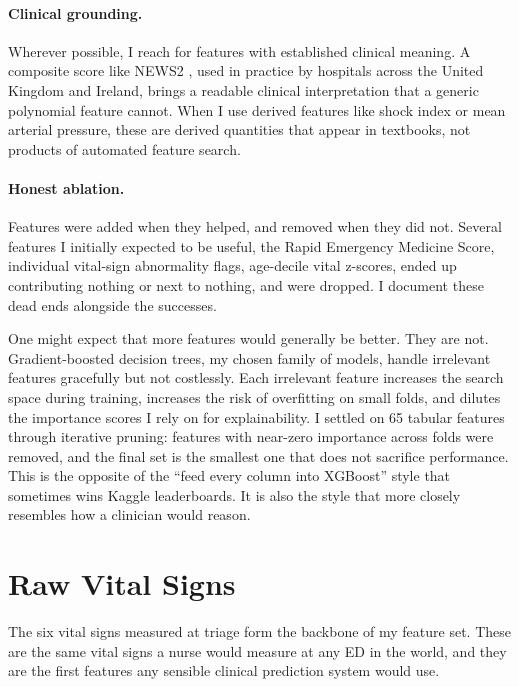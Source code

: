 \paragraph{Clinical grounding.} Wherever possible, I reach for features with established clinical meaning. A composite score like NEWS2 \citep{rcp2017news2}, used in practice by hospitals across the United Kingdom and Ireland, brings a readable clinical interpretation that a generic polynomial feature cannot. When I use derived features like shock index or mean arterial pressure, these are derived quantities that appear in textbooks, not products of automated feature search.

\paragraph{Honest ablation.} Features were added when they helped, and removed when they did not. Several features I initially expected to be useful, the Rapid Emergency Medicine Score, individual vital-sign abnormality flags, age-decile vital z-scores, ended up contributing nothing or next to nothing, and were dropped. I document these dead ends alongside the successes.

\begin{remarkbox}
One might expect that more features would generally be better. They are not. Gradient-boosted decision trees, my chosen family of models, handle irrelevant features gracefully but not costlessly. Each irrelevant feature increases the search space during training, increases the risk of overfitting on small folds, and dilutes the importance scores I rely on for explainability. I settled on 65 tabular features through iterative pruning: features with near-zero importance across folds were removed, and the final set is the smallest one that does not sacrifice performance. This is the opposite of the ``feed every column into XGBoost'' style that sometimes wins Kaggle leaderboards. It is also the style that more closely resembles how a clinician would reason.
\end{remarkbox}

\section{Raw Vital Signs}

The six vital signs measured at triage form the backbone of my feature set. These are the same vital signs a nurse would measure at any ED in the world, and they are the first features any sensible clinical prediction system would use.

